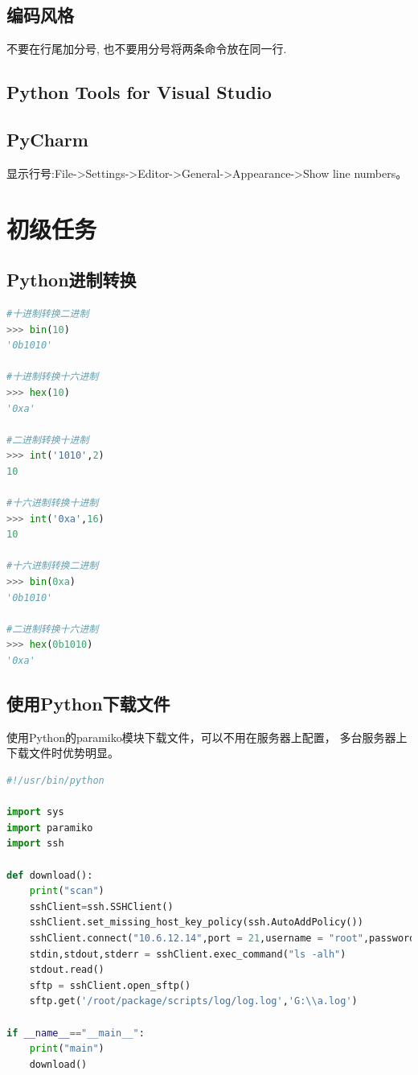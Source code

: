 \documentclass{book}
\begin{document}
\subsection{编码风格}

不要在行尾加分号, 也不要用分号将两条命令放在同一行.

\subsection{Python Tools for Visual Studio}

\subsection{PyCharm}

显示行号:File->Settings->Editor->General->Appearance->Show line numbers。

\section{初级任务}

\subsection{Python进制转换}

\begin{lstlisting}[language=Python]
#十进制转换二进制 
>>> bin(10) 
'0b1010' 

#十进制转换十六进制 
>>> hex(10) 
'0xa' 

#二进制转换十进制 
>>> int('1010',2) 
10 

#十六进制转换十进制 
>>> int('0xa',16) 
10 

#十六进制转换二进制 
>>> bin(0xa) 
'0b1010' 

#二进制转换十六进制 
>>> hex(0b1010) 
'0xa' 
\end{lstlisting}

\subsection{使用Python下载文件}

使用Python的paramiko模块下载文件，可以不用在服务器上配置，
多台服务器上下载文件时优势明显。

\begin{lstlisting}[language=Python]
#!/usr/bin/python

import sys
import paramiko
import ssh

def download():
	print("scan")
	sshClient=ssh.SSHClient()
	sshClient.set_missing_host_key_policy(ssh.AutoAddPolicy())
	sshClient.connect("10.6.12.14",port = 21,username = "root",password = "123456")
	stdin,stdout,stderr = sshClient.exec_command("ls -alh")
	stdout.read()
	sftp = sshClient.open_sftp()
	sftp.get('/root/package/scripts/log/log.log','G:\\a.log')

if __name__=="__main__":
	print("main")
	download()
\end{lstlisting}
\end{document}
